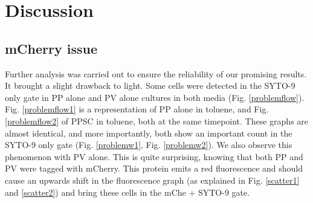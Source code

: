 \documentclass[a4paper, 10pt, conference]{ieeeconf}   %
\begin{document}
\section{Discussion}


%	 
%	  
%


\subsection{mCherry issue}
Further analysis was carried out to ensure the reliability of our promising results. It brought a slight drawback to light.
Some cells were detected in the SYTO-9 only gate in PP alone and PV alone cultures in both media (Fig. \ref{problemflow}). Fig. \ref{problemflow1} is a representation of PP alone in toluene, and Fig. \ref{problemflow2} of PPSC in toluene, both at the same timepoint. These graphs are almost identical, and more importantly, both show an important count in the SYTO-9 only gate (Fig. \ref{problemw1}, Fig. \ref{problemw2}). We also observe this phenomenon with PV alone.
This is quite surprising, knowing that both PP and PV were tagged with mCherry. This protein emits a
red fluorescence and should cause an upwards shift in the fluorescence graph (as explained in Fig. \ref{scatter1} and \ref{scatter2}) and bring these cells in the mChe + SYTO-9 gate.
\end{document}
